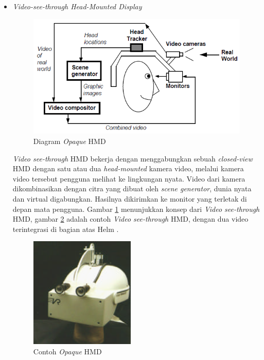 \begin{itemize}
\item {\textit{Video-see-through Head-Mounted Display}}

\begin{figure}[h]
\begin{center}
\includegraphics[width=11cm]{./images/opaque_HMD}
\caption{\label{fig:opaque_HMD} Diagram \textit{Opaque} HMD}
\end{center}
\end{figure}

\textit{Video see-through} HMD bekerja dengan menggabungkan sebuah \textit{closed-view} HMD dengan satu atau dua \textsl{head-mounted} kamera video, melalui kamera video tersebut pengguna melihat ke lingkungan nyata. Video dari kamera dikombinasikan dengan citra yang dibuat oleh \textit{scene generator}, dunia nyata dan virtual digabungkan. Hasilnya dikirimkan ke monitor yang terletak di depan mata pengguna. Gambar \ref{fig:opaque_HMD} menunjukkan konsep dari \textit{Video see-through} HMD, gambar \ref{fig:actual_opaque_HMD} adalah contoh \textit{Video see-through} HMD, dengan dua video terintegrasi di bagian atas Helm \cite{Azuma1997}.

\begin{figure}[h]
\begin{center}
\includegraphics[width=5cm]{./images/actual_opaque_HMD}
\caption {\label{fig:actual_opaque_HMD} Contoh \textit{Opaque} HMD}
\end{center}
\end{figure}


\end{itemize}
